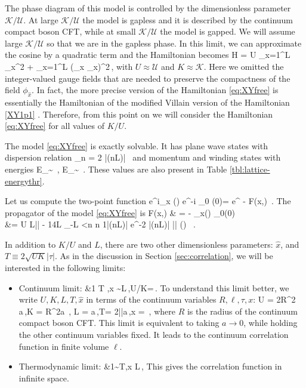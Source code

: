 \documentclass[12pt]{article}
\numberwithin{equation}{section}
\begin{document}
The phase diagram of this model is controlled by the dimensionless parameter $\mathcal K/\mathcal U$.
At large $\mathcal K/\mathcal U$ the model is gapless and it is described by the continuum compact boson CFT, while at small $\mathcal K/\mathcal U$ the model is gapped.
We will assume large $\mathcal K/\mathcal U$ so that we are in the gapless phase.
In this limit, we can approximate the cosine by a quadratic term and the Hamiltonian becomes
\ie\label{eq:XYfree}
H  = {  U } \sum_{\hat x=1}^L \pi_{\hat x}^2 +   \sum_{\hat x=1}^L (\Delta_x \phi_{\hat x})^2\,,
\fe
with $U\approx\mathcal{U}$ and $K\approx \mathcal{K}$.  Here we omitted the integer-valued gauge fields that are needed to preserve the compactness of the field $\phi_{\hat x}$. In fact, the more precise version of the Hamiltonian \eqref{eq:XYfree} is essentially the Hamiltonian of the modified Villain version of the Hamiltonian \eqref{XY1p1}  \cite{Gorantla:2021svj}.  Therefore, from this point on we will consider  the Hamiltonian \eqref{eq:XYfree} for all values of $K/U$.

The model \eqref{eq:XYfree} is exactly solvable.
It has plane wave states with dispersion relation
\ie
\omega_n =  2  \left|\sin \left({\pi n\over L}\right)\right|~
\fe
and momentum and winding states with energies
\ie
E_{}\sim{}~,\quad
E_{}\sim{}~.
\fe
These values are also present in Table \ref{tbl:lattice-energythr}.



Let us compute the two-point function
\ie
\langle e^{i\phi_{\hat x} (\tau) } e^{-i \phi_{0} (0)}\rangle= e^{ - F(\hat x,\tau)~.}
\fe
The propagator of the model \eqref{eq:XYfree} is
\ie
F(\hat x,\tau) & = - \langle \phi_{\hat x}(\tau) \phi_0(0) \rangle
\\
&= { U  L}|\tau | - {1\over 4L }  \sum_{-{L} <n \atop n} {1\over |\sin({\pi n\over L})|}  e^{-2 |\sin({\pi n\over L})| |\tau|} \cos\left(\right)
~.
\fe

In addition to $K/U$ and $L$, there are two other dimensionless parameters: $\hat x$, and  $T\equiv 2\sqrt{UK} |\tau| $.
As in the discussion in  Section \ref{sec:correlation}, we will be interested in the following limits:
\begin{itemize}
\item Continuum limit:
\ie
&1 \ll T ,\hat x \sim L\,,\qquad U/K=\,.
\fe
 To understand this limit better, we write $U,K,L, T,\hat x$ in terms of the continuum variables $R,\ell,\tau,x$:
\ie
U = {2\pi \over R^2 a}\,,\qquad K = {R^2\pi a} \,,\qquad
L  ={ \ell\over a}\,,\qquad T=  {2|\tau|\over a}\,,\qquad \hat x = \,,
\fe
where $R$ is the radius of the continuum compact boson CFT.
This   limit is  equivalent to taking $a\to0$, while holding the other continuum variables  fixed.  It leads to the continuum correlation function  in finite volume $\ell$.


\item Thermodynamic limit: \ie
&1\sim T,\hat x \ll L\,,
\fe
 This gives the correlation function in infinite space.
 \end{itemize}
\end{document}
